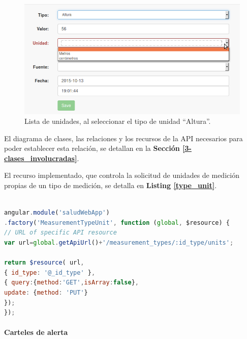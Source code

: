  \begin{figure}[h]
  \centering
  \includegraphics[width=.8\textwidth]{img/3-unidad_altura}
  \caption{Lista de unidades, al seleccionar el tipo de unidad ``Altura''.}
  \label{unidad_altura}
\end{figure}

\clearpage

El diagrama de clases, las relaciones y los recursos de la API necesarios para poder establecer esta relación, se detallan en la \textbf{Sección \ref{3-clases_involucradas}}.

El recurso implementado, que controla la solicitud de unidades de medición propias de un tipo de medición, se detalla en \textbf{Listing \ref{type_unit}}.

\begin{lstlisting}[language=JavaScript, caption=Recurso que solicita las unidades de un tipo de medición específico., label=type_unit]

angular.module('saludWebApp')                                                   
.factory('MeasurementTypeUnit', function (global, $resource) {                  
// URL of specific API resource                                             
var url=global.getApiUrl()+'/measurement_types/:id_type/units'; 

return $resource( url,                                                      
{ id_type: '@_id_type' },                                                        
{ query:{method:'GET',isArray:false},                                   
update: {method: 'PUT'}                                               
});                                                                     
});
\end{lstlisting}



\paragraph{Carteles de alerta}

